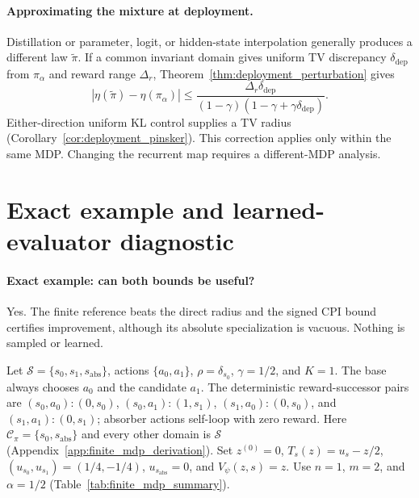 \documentclass{article}
\theoremstyle{plain}
\theoremstyle{definition}
\theoremstyle{remark}
\begin{document}
\paragraph{Approximating the mixture at deployment.}
Distillation or parameter, logit, or hidden-state interpolation generally
produces a different law $\widetilde\pi$. If a common invariant domain gives
uniform TV discrepancy $\delta_{\mathrm{dep}}$ from $\pi_\alpha$ and reward
range $\Delta_r$, Theorem~\ref{thm:deployment_perturbation} gives
\begin{equation}
|\eta(\widetilde\pi)-\eta(\pi_\alpha)|
\le
\frac{\Delta_r\delta_{\mathrm{dep}}}
{(1-\gamma)(1-\gamma+\gamma\delta_{\mathrm{dep}})}.
\label{eq:deployment_summary_main}
\end{equation}
Either-direction uniform KL control supplies a TV radius
(Corollary~\ref{cor:deployment_pinsker}). This correction applies only within
the same MDP. Changing the recurrent map requires a different-MDP analysis.

\section{Exact example and learned-evaluator diagnostic}
\label{sec:finite_mdp_example}

\paragraph{Exact example: can both bounds be useful?}
Yes. The finite reference beats the direct radius and the signed CPI bound
certifies improvement, although its absolute specialization is vacuous.
Nothing is sampled or learned.

Let $\mathcal S=\{s_0,s_1,s_{\mathrm{abs}}\}$, actions
$\{a_0,a_1\}$, $\rho=\delta_{s_0}$, $\gamma=1/2$, and $K=1$. The base always
chooses $a_0$ and the candidate $a_1$. The deterministic reward-successor
pairs are $(s_0,a_0):(0,s_0)$, $(s_0,a_1):(1,s_1)$,
$(s_1,a_0):(0,s_0)$, and $(s_1,a_1):(0,s_1)$; absorber actions self-loop with
zero reward. Here $\mathcal C_\pi=\{s_0,s_{\mathrm{abs}}\}$ and every other
domain is $\mathcal S$ (Appendix~\ref{app:finite_mdp_derivation}). Set
$z^{(0)}=0$, $T_s(z)=u_s-z/2$, $(u_{s_0},u_{s_1})=(1/4,-1/4)$,
$u_{s_{\mathrm{abs}}}=0$, and $V_\psi(z,s)=z$. Use $n=1$, $m=2$, and
$\alpha=1/2$ (Table~\ref{tab:finite_mdp_summary}).
\end{document}
